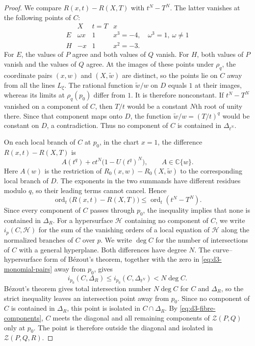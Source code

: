 \documentclass[11pt,letterpaper]{article}
\numberwithin{equation}{section}
\theoremstyle{remark}
\theoremstyle{plain}
\newcommand{\C}{\mathbb{C}}
\newcommand{\ord}{\operatorname{ord}}
\begin{document}
\begin{proof}
We compare $R(x,t)-R(X,T)$ with $t^N-T^N$.
The latter vanishes at the following points of $C$:
\begin{equation}
\begin{array}{c|c|c|c}
 &X&t=T&x\\ \hline
 E&\omega x&1&x^3=-4,\quad \omega^3=1,\ \omega\neq1\\
 H&-x&1&x^2=-3.
\end{array}
\label{eq:d3-monomial-pairs}
\end{equation}
For $E$, the values of $P$ agree and both values of $Q$ vanish.
For $H$, both values of $P$ vanish and the values of $Q$ agree.
At the images of these points under $\rho_q$, the coordinate pairs
$(x,w)$ and $(X,\widetilde w)$ are distinct, so the points lie on
$C$ away from all the lines $L_\xi$.
The rational function $\widetilde w/w$ on $D$ equals $1$ at
their images, whereas its limits at $\rho_q(p_0)$ differ from $1$.
It is therefore nonconstant.
If $t^N-T^N$ vanished on a component of $C$, then $T/t$ would
be a constant $N$th root of unity there.  Since that component
maps onto $D$, the function $\widetilde w/w=(T/t)^q$ would
be constant on $D$, a contradiction.
Thus no component of $C$ is contained in $\Delta_{t^N}$.

On each local branch of $C$ at $p_0$, in the chart $x=1$, the
difference $R(x,t)-R(X,T)$ is
\[
 A(t^q)+ct^N\bigl(1-U(t^q)^N\bigr),
 \qquad A\in\C\{w\}.
\]
Here $A(w)$ is the restriction of $R_0(x,w)-R_0(X,\widetilde w)$
to the corresponding local branch of $D$.
The exponents in the two summands have different residues modulo $q$,
so their leading terms cannot cancel.  Hence
\[
 \ord_t\bigl(R(x,t)-R(X,T)\bigr)
 \leq\ord_t(t^N-T^N).
\]
Since every component of $C$ passes through $p_0$, the inequality
implies that none is contained in $\Delta_R$.
For a hypersurface $\mathcal H$ containing no component of $C$, we write
$i_p(C,\mathcal H)$ for the sum of the vanishing orders of a local equation
of $\mathcal H$ along the normalized branches of $C$ over $p$.
We write $\deg C$ for the number of intersections of $C$
with a general hyperplane.  Both differences have degree $N$.
The curve--hypersurface form of B\'ezout's theorem, together
with the zero in \eqref{eq:d3-monomial-pairs} away from $p_0$, gives
\[
 i_{p_0}(C,\Delta_R)
 \leq i_{p_0}(C,\Delta_{t^N})<N\deg C.
\]
B\'ezout's theorem gives total intersection number $N\deg C$
for $C$ and $\Delta_R$, so the strict inequality leaves an
intersection point away from $p_0$.  Since no component of $C$
is contained in $\Delta_R$, this point is isolated in
$C\cap\Delta_R$.  By \eqref{eq:d3-fibre-components}, $C$ meets
the diagonal and all remaining components of $\mathcal Z(P,Q)$
only at $p_0$.  The point is therefore outside the diagonal and
isolated in $\mathcal Z(P,Q,R)$.
\end{proof}
\end{document}
